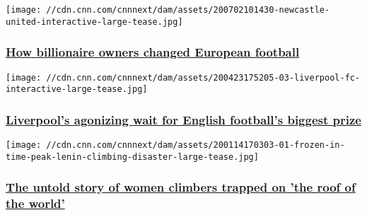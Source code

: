 \href{https://www.cnn.com/interactive/2020/06/sport/newcastle-united-takeover-billionaire-investment-european-football/}{}

\texttt{[image: //cdn.cnn.com/cnnnext/dam/assets/200702101430-newcastle-united-interactive-large-tease.jpg]}

\hypertarget{how-billionaire-owners-changed-european-football}{%
\subsubsection{\texorpdfstring{\href{https://www.cnn.com/interactive/2020/06/sport/newcastle-united-takeover-billionaire-investment-european-football/}{How
billionaire owners changed European
football}}{How billionaire owners changed European football}}\label{how-billionaire-owners-changed-european-football}}

\href{https://edition.cnn.com/interactive/2020/04/sport/liverpoolpremierleaguetitle/}{}

\texttt{[image: //cdn.cnn.com/cnnnext/dam/assets/200423175205-03-liverpool-fc-interactive-large-tease.jpg]}

\hypertarget{liverpools-agonizing-wait-for-english-footballs-biggest-prize}{%
\subsubsection{\texorpdfstring{\href{https://edition.cnn.com/interactive/2020/04/sport/liverpoolpremierleaguetitle/}{Liverpool's
agonizing wait for English football's biggest
prize}}{Liverpool's agonizing wait for English football's biggest prize}}\label{liverpools-agonizing-wait-for-english-footballs-biggest-prize}}

\href{https://www.cnn.com/interactive/2020/01/sport/russian-climbers-peak-lenin-spt-intl/}{}

\texttt{[image: //cdn.cnn.com/cnnnext/dam/assets/200114170303-01-frozen-in-time-peak-lenin-climbing-disaster-large-tease.jpg]}

\hypertarget{the-untold-story-of-women-climbers-trapped-on-the-roof-of-the-world}{%
\subsubsection{\texorpdfstring{\href{https://www.cnn.com/interactive/2020/01/sport/russian-climbers-peak-lenin-spt-intl/}{The
untold story of women climbers trapped on 'the roof of the
world'}}{The untold story of women climbers trapped on 'the roof of the world'}}\label{the-untold-story-of-women-climbers-trapped-on-the-roof-of-the-world}}

